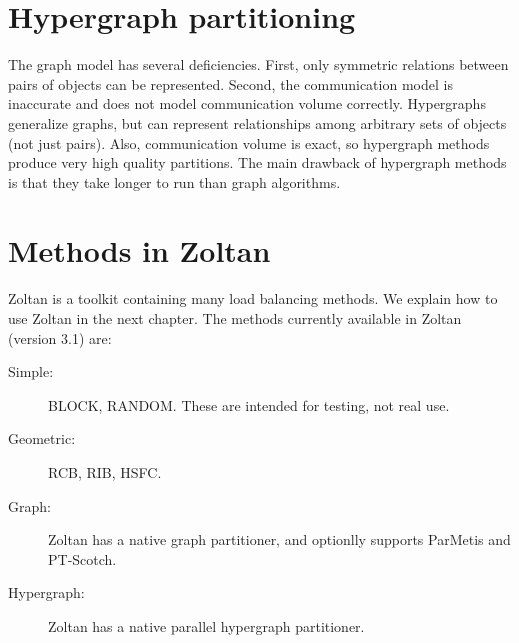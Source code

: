 \section{Hypergraph partitioning}
The graph model has several deficiencies. First, only symmetric
relations between pairs of objects can be represented. Second, 
the communication model is inaccurate and does not model 
communication volume correctly.
Hypergraphs generalize graphs, but can represent relationships
among arbitrary sets of objects (not just pairs). Also,
communication volume is exact, so hypergraph methods 
produce very high quality partitions. The main drawback of hypergraph
methods is that they take longer to run than graph algorithms. 

\section{Methods in Zoltan}
Zoltan is a toolkit containing many load balancing methods. We explain how 
to use Zoltan in the next chapter. The methods currently available
in Zoltan (version 3.1) are:
\begin{description}
\item[Simple:] BLOCK, RANDOM. These are intended for testing, not real use.
\item[Geometric:] RCB, RIB, HSFC.
\item[Graph:] Zoltan has a native graph partitioner, and optionlly supports ParMetis and PT-Scotch.
\item[Hypergraph:] Zoltan has a native parallel hypergraph partitioner.
\end{description}

